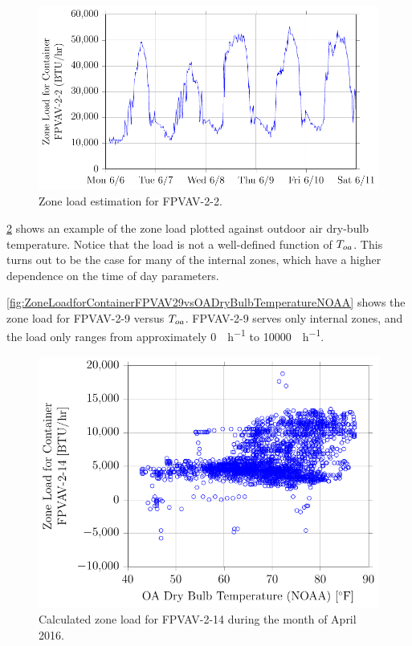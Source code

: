 \begin{figure}
\centering
\includegraphics[]{Plots/2016-06-22-1643-ZoneLoadforContainerFPVAV22-TikzData.pdf}
\caption{Zone load estimation for FPVAV-2-2.}
\label{fig:2016-06-22-1643-ZoneLoadforContainerFPVAV22-TikzData}
\end{figure}



\figref{}
\ref{fig:ZoneLoadforContainerFPVAV214vsOADryBulbTemperatureNOAA} shows
an example of the zone load plotted against outdoor air dry-bulb
temperature. Notice that the load is not a well-defined function of
\(T_{oa}\). This turns out to be the case for many of the internal zones,
which have a higher dependence on the time of day parameters. 

\figref{}
\ref{fig:ZoneLoadforContainerFPVAV29vsOADryBulbTemperatureNOAA} shows
the zone load for FPVAV-2-9 versus \(T_{oa}\). FPVAV-2-9 serves only
internal zones, and the load only ranges from approximately
\SI{0}{\btu\per\hour} to \SI{10000}{\btu\per\hour}.


\begin{figure}
\centering
\includegraphics[]{Plots/2016-06-22-1704-ZoneLoadforContainerFPVAV214vsOADryBulbTemperatureNOAA.pdf}
\caption{Calculated zone load for FPVAV-2-14 during the month of April 2016.}
\label{fig:ZoneLoadforContainerFPVAV214vsOADryBulbTemperatureNOAA}
\end{figure}


